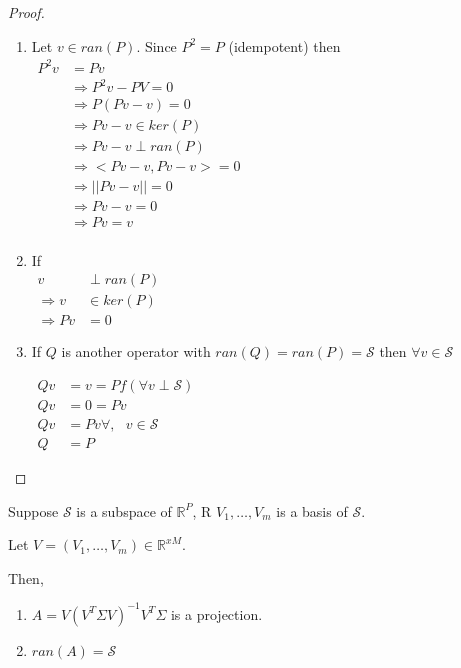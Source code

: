\documentclass[11pt,fleqn]{book} %
\begin{document}
\begin{proof}
	\begin{enumerate}
		\item Let $v \in ran(P)$. Since $P^2 = P$ (idempotent) then\\ 
			$\begin{aligned}
					P^2 v &= Pv\\
					&\Rightarrow P^2 v - PV = 0\\
					&\Rightarrow P(Pv-v) = 0 \\
					&\Rightarrow Pv - v \in ker(P)\\
					&\Rightarrow Pv - v \perp ran(P)\\
					&\Rightarrow <Pv - v, Pv - v> = 0\\
					&\Rightarrow ||Pv - v || = 0\\
					&\Rightarrow Pv - v = 0\\
					&\Rightarrow Pv = v\\	
			\end{aligned}$
	\item If\\ 
		$\begin{aligned}
				v &\perp ran(P)\\
				\Rightarrow v &\in ker(P)\\
				\Rightarrow Pv &= 0
		\end{aligned}$

	\item If $Q$ is another operator with $ran(Q) = ran(P) = \mathscr{S}$ then $\forall v \in \mathscr{S}$

		$\begin{aligned}
			Qv &= v = Pf (\forall v \perp \mathscr{S})\\
			Qv &= 0 = Pv\\
			Qv &= Pv \forall,\text{ } v \in \mathscr{S}\\
			Q &= P
		\end{aligned}$
	
	\end{enumerate}
\end{proof}


\begin{theorem}
	Suppose $\mathscr{S}$ is a subspace of $\mathbb{R}^P$, R $V_1, \dots, V_m$ is a basis of $\mathscr{S}$. 

	Let $V = (V_1, \dots, V_m) \in \mathbb{R}^{xM}$. 

	Then, 

	\begin{enumerate}
		\item $A = V(V^T\Sigma V)^{-1}V^T \Sigma$ is a projection.
		\item $ran(A) = \mathscr{S}$ 
	\end{enumerate}
\end{theorem}
\end{document}
